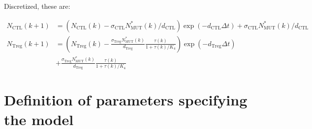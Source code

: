 \documentclass[11pt, a4paper, preprint]{article}
\begin{document}
Discretized, these are:

\begin{equation}\tag{2.10}
\begin{split}
N_\text{CTL}(k+1) & =  \left (N_\text{CTL}(k)-\sigma_{\text{CTL}}N_{\text{MUT}}^*(k)/d_{\text{CTL}}\right )\exp(- d_{\text{CTL}}\Delta t) + \sigma_{\text{CTL}}N_{\text{MUT}}^*(k)/d_{\text{CTL}}\\
N_\text{Treg}(k+1) & =  \left (N_\text{Treg}(k)-\frac{\sigma_{\text{Treg}}N_{\text{MUT}}^*(k)}{d_{\text{Treg}}} \frac{\tau(k)}{1+\tau(k)/K_4}\right )\exp(-d_{\text{Treg}}\Delta t)\\
&+ \frac{\sigma_{\text{Treg}}N_{\text{MUT}}^*(k)}{d_{\text{Treg}}} \frac{\tau(k)}{1+\tau(k)/K_4}
\end{split}
\end{equation}

\section{Definition of parameters specifying the model}
\end{document}

